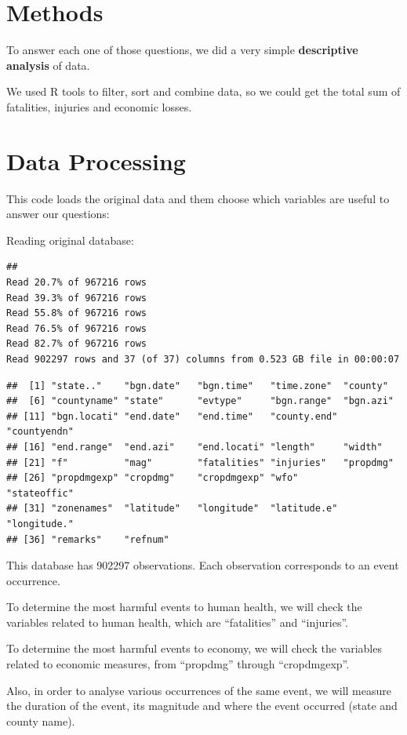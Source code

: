\documentclass[]{article}
\begin{document}
\section{Methods}\label{methods}

To answer each one of those questions, we did a very simple
\textbf{descriptive analysis} of data.

We used R tools to filter, sort and combine data, so we could get the
total sum of fatalities, injuries and economic losses.

\section{Data Processing}\label{data-processing}

This code loads the original data and them choose which variables are
useful to answer our questions:

Reading original database:

\begin{verbatim}
## 
Read 20.7% of 967216 rows
Read 39.3% of 967216 rows
Read 55.8% of 967216 rows
Read 76.5% of 967216 rows
Read 82.7% of 967216 rows
Read 902297 rows and 37 (of 37) columns from 0.523 GB file in 00:00:07
\end{verbatim}

\begin{verbatim}
##  [1] "state.."    "bgn.date"   "bgn.time"   "time.zone"  "county"    
##  [6] "countyname" "state"      "evtype"     "bgn.range"  "bgn.azi"   
## [11] "bgn.locati" "end.date"   "end.time"   "county.end" "countyendn"
## [16] "end.range"  "end.azi"    "end.locati" "length"     "width"     
## [21] "f"          "mag"        "fatalities" "injuries"   "propdmg"   
## [26] "propdmgexp" "cropdmg"    "cropdmgexp" "wfo"        "stateoffic"
## [31] "zonenames"  "latitude"   "longitude"  "latitude.e" "longitude."
## [36] "remarks"    "refnum"
\end{verbatim}

This database has 902297 observations. Each observation corresponds to
an event occurrence.

To determine the most harmful events to human health, we will check the
variables related to human health, which are ``fatalities'' and
``injuries''.

To determine the most harmful events to economy, we will check the
variables related to economic measures, from ``propdmg'' through
``cropdmgexp''.

Also, in order to analyse various occurrences of the same event, we will
measure the duration of the event, its magnitude and where the event
occurred (state and county name).
\end{document}
